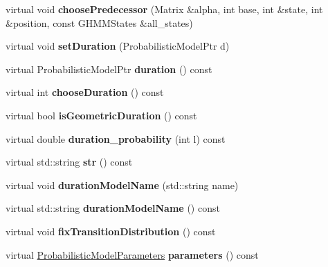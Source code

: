 \begin{DoxyCompactItemize}
virtual void {\bfseries choose\+Predecessor} (Matrix \&alpha, int base, int \&state, int \&position, const G\+H\+M\+M\+States \&all\+\_\+states)
\item 
\mbox{\label{classtops_1_1GHMMExplicitDurationState_a60dd13ec0578ffac894e680b27f65edc}} 
virtual void {\bfseries set\+Duration} (Probabilistic\+Model\+Ptr d)
\item 
\mbox{\label{classtops_1_1GHMMExplicitDurationState_ad445b5122638a134e589549d06bbe696}} 
virtual Probabilistic\+Model\+Ptr {\bfseries duration} () const
\item 
\mbox{\label{classtops_1_1GHMMExplicitDurationState_adb7d7b6672a77b003d8e1f9932495ff2}} 
virtual int {\bfseries choose\+Duration} () const
\item 
\mbox{\label{classtops_1_1GHMMExplicitDurationState_a067bee304527756c03bfc4b7491eb25c}} 
virtual bool {\bfseries is\+Geometric\+Duration} () const
\item 
\mbox{\label{classtops_1_1GHMMExplicitDurationState_a202a6102d036b92a9c872c7ddeae0156}} 
virtual double {\bfseries duration\+\_\+probability} (int l) const
\item 
\mbox{\label{classtops_1_1GHMMExplicitDurationState_a5118ccadbebfb98b74975d5ec7fb48d6}} 
virtual std\+::string {\bfseries str} () const
\item 
\mbox{\label{classtops_1_1GHMMExplicitDurationState_ae45559048fc040dcaa022d495f0f01bc}} 
virtual void {\bfseries duration\+Model\+Name} (std\+::string name)
\item 
\mbox{\label{classtops_1_1GHMMExplicitDurationState_ae3bd1e5677c8c2781e2efd9a47dcb98c}} 
virtual std\+::string {\bfseries duration\+Model\+Name} () const
\item 
\mbox{\label{classtops_1_1GHMMExplicitDurationState_a6c164e19ae59980a7122de0126840f84}} 
virtual void {\bfseries fix\+Transition\+Distribution} () const
\item 
\mbox{\label{classtops_1_1GHMMExplicitDurationState_ad0999ee0586318ae9076875421744acc}} 
virtual \hyperlink{classtops_1_1ProbabilisticModelParameters}{Probabilistic\+Model\+Parameters} {\bfseries parameters} () const
\end{DoxyCompactItemize}
